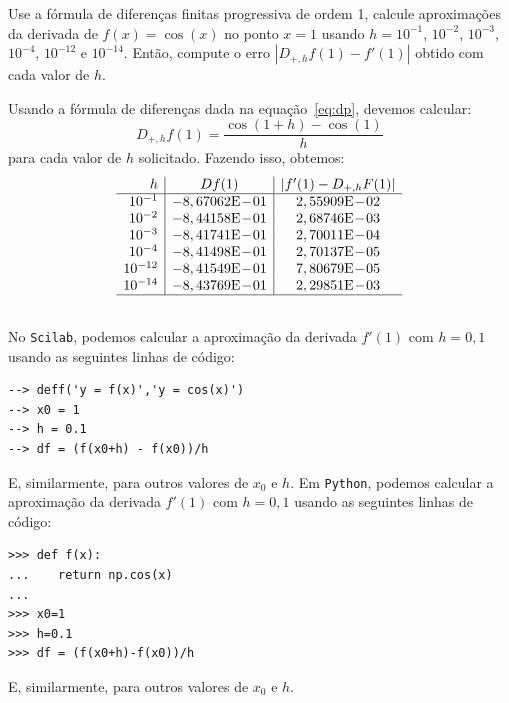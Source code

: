\begin{ex}\label{ex:dp}
Use a fórmula de diferenças finitas progressiva de ordem 1, calcule aproximações da derivada de $f(x)=\cos(x)$ no ponto $x=1$ usando $h=10^{-1}$, $10^{-2}$, $10^{-3}$, $10^{-4}$, $10^{-12}$ e $10^{-14}$. Então, compute o erro $|D_{+,h}f(1)-f'(1)|$ obtido com cada valor de $h$.
\end{ex}
\begin{sol}
Usando a fórmula de diferenças dada na equação~\eqref{eq:dp}, devemos calcular:
\begin{equation*}
  D_{+,h}f(1) = \frac{\cos(1 + h) - \cos(1)}{h}
\end{equation*}
para cada valor de $h$ solicitado. Fazendo isso, obtemos:
\begin{equation*}
  \begin{array}{r|c|c}
    h & Df(1) & |f'(1) - D_{+,h}F(1)| \\ \hline
    10^{-1} & -8,67062\E-01 & 2,55909\E-02\\
    10^{-2} & -8,44158\E-01 & 2,68746\E-03\\
    10^{-3} & -8,41741\E-01 & 2,70011\E-04\\
    10^{-4} & -8,41498\E-01 & 2,70137\E-05 \\
    10^{-12} & -8,41549\E-01 & 7,80679\E-05\\
    10^{-14} & -8,43769\E-01 & 2,29851\E-03 \\\hline
    \multicolumn{3}{c}{}
  \end{array}
\end{equation*}

\ifisscilab
No \verb+Scilab+, podemos calcular a aproximação da derivada $f'(1)$ com $h=0,1$ usando as seguintes linhas de código:
\begin{verbatim}
--> deff('y = f(x)','y = cos(x)')
--> x0 = 1
--> h = 0.1
--> df = (f(x0+h) - f(x0))/h
\end{verbatim}
E, similarmente, para outros valores de $x_0$ e $h$.
\fi
\ifispython
Em \verb+Python+, podemos calcular a aproximação da derivada $f'(1)$ com $h=0,1$ usando as seguintes linhas de código:
\begin{verbatim}
>>> def f(x):
...    return np.cos(x)
...
>>> x0=1
>>> h=0.1
>>> df = (f(x0+h)-f(x0))/h
\end{verbatim}
E, similarmente, para outros valores de $x_0$ e $h$.
\fi
\end{sol}

